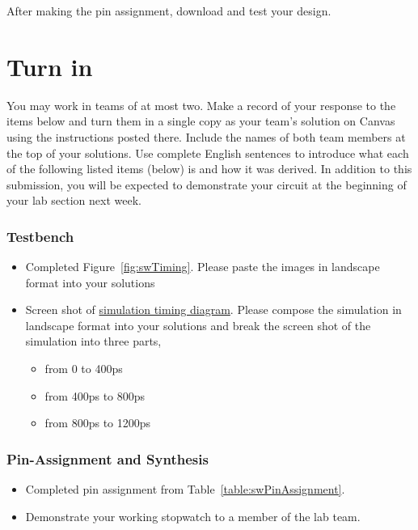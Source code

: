 After making the pin assignment, download and test your design.

\section{Turn in}

You may work in teams of at most two. Make a record of your response to
the items below and turn them in a single copy as your team's solution
on Canvas using the instructions posted there. Include the names of both
team members at the top of your solutions. Use complete English
sentences to introduce what each of the following listed items (below)
is and how it was derived. In addition to this submission, you will be
expected to demonstrate your circuit at the beginning of your lab
section next week.

\subsubsection{Testbench}

\begin{itemize}
    \item
        Completed Figure~\ref{fig:swTiming}. Please paste the images in landscape format into your solutions

    \item
        Screen shot of \hyperlink{link:swTestbench}{simulation timing diagram}. Please compose the simulation
        in landscape
        format into your solutions and break the screen shot of the simulation into three parts,

        \begin{itemize}
            \item
                from 0 to 400ps
            \item
                from 400ps to 800ps
            \item
                from 800ps to 1200ps
        \end{itemize}
\end{itemize}

\subsubsection{Pin-Assignment and Synthesis}

\begin{itemize}
    \item
        Completed pin assignment from Table~\ref{table:swPinAssignment}.
    \item
        Demonstrate your working stopwatch to a member of the lab team.
\end{itemize}
